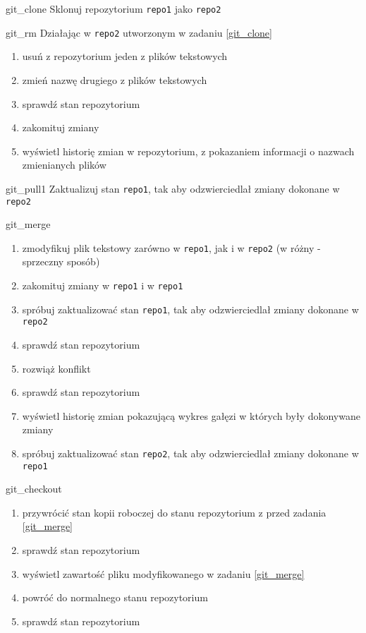 \begin{Zadanie}{}{git_clone}
Sklonuj repozytorium \Verb#repo1# jako \Verb#repo2#
\end{Zadanie}

\begin{Zadanie}{}{git_rm}
Działając w \Verb#repo2# utworzonym w zadaniu \ref{git_clone}
\begin{enumerate}
\item usuń z repozytorium jeden z plików tekstowych
\item zmień nazwę drugiego z plików tekstowych
\item sprawdź stan repozytorium
\item zakomituj zmiany
\item wyświetl historię zmian w repozytorium, z pokazaniem informacji o nazwach zmienianych plików
\end{enumerate}
\end{Zadanie}

\begin{Zadanie}{}{git_pull1}
Zaktualizuj stan \Verb#repo1#, tak aby odzwierciedlał zmiany dokonane w \Verb#repo2#
\end{Zadanie}

\begin{Zadanie}{}{git_merge}
\begin{enumerate}
\item zmodyfikuj plik tekstowy zarówno w \Verb#repo1#, jak i w \Verb#repo2# (w różny - sprzeczny sposób)
\item zakomituj zmiany w \Verb#repo1# i w \Verb#repo1#
\item spróbuj zaktualizować stan \Verb#repo1#, tak aby odzwierciedlał zmiany dokonane w \Verb#repo2#
\item sprawdź stan repozytorium
\item rozwiąż konflikt
\item sprawdź stan repozytorium
\item wyświetl historię zmian pokazującą wykres gałęzi w których były dokonywane zmiany
\item spróbuj zaktualizować stan \Verb#repo2#, tak aby odzwierciedlał zmiany dokonane w \Verb#repo1#
\end{enumerate}
\end{Zadanie}

\begin{Zadanie}{}{git_checkout}
\begin{enumerate}
\item przywrócić stan kopii roboczej do stanu repozytorium z przed zadania \ref{git_merge}
\item sprawdź stan repozytorium
\item wyświetl zawartość pliku modyfikowanego w zadaniu \ref{git_merge}
\item powróć do normalnego stanu repozytorium
\item sprawdź stan repozytorium
\end{enumerate}
\end{Zadanie}

